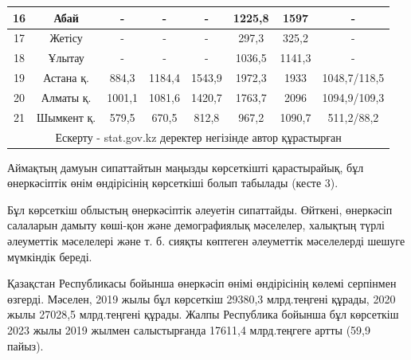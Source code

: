 \begin{table}[H]
{\begin{tabular}{|cccccccc|}
\multicolumn{1}{|c|}{16} &
  \multicolumn{1}{c|}{Абай} &
  \multicolumn{1}{c|}{-} &
  \multicolumn{1}{c|}{-} &
  \multicolumn{1}{c|}{-} &
  \multicolumn{1}{c|}{1225,8} &
  \multicolumn{1}{c|}{1597} &
  - \\ \hline
\multicolumn{1}{|c|}{17} &
  \multicolumn{1}{c|}{Жетісу} &
  \multicolumn{1}{c|}{-} &
  \multicolumn{1}{c|}{-} &
  \multicolumn{1}{c|}{-} &
  \multicolumn{1}{c|}{297,3} &
  \multicolumn{1}{c|}{325,2} &
  - \\ \hline
\multicolumn{1}{|c|}{18} &
  \multicolumn{1}{c|}{Ұлытау} &
  \multicolumn{1}{c|}{-} &
  \multicolumn{1}{c|}{-} &
  \multicolumn{1}{c|}{-} &
  \multicolumn{1}{c|}{1036,5} &
  \multicolumn{1}{c|}{1141,3} &
  - \\ \hline
\multicolumn{1}{|c|}{19} &
  \multicolumn{1}{c|}{Астана қ.} &
  \multicolumn{1}{c|}{884,3} &
  \multicolumn{1}{c|}{1184,4} &
  \multicolumn{1}{c|}{1543,9} &
  \multicolumn{1}{c|}{1972,3} &
  \multicolumn{1}{c|}{1933} &
  1048,7/118,5 \\ \hline
\multicolumn{1}{|c|}{20} &
  \multicolumn{1}{c|}{Алматы қ.} &
  \multicolumn{1}{c|}{1001,1} &
  \multicolumn{1}{c|}{1081,6} &
  \multicolumn{1}{c|}{1420,7} &
  \multicolumn{1}{c|}{1763,7} &
  \multicolumn{1}{c|}{2096} &
  1094,9/109,3 \\ \hline
\multicolumn{1}{|c|}{21} &
  \multicolumn{1}{c|}{Шымкент қ.} &
  \multicolumn{1}{c|}{579,5} &
  \multicolumn{1}{c|}{670,5} &
  \multicolumn{1}{c|}{812,8} &
  \multicolumn{1}{c|}{967,2} &
  \multicolumn{1}{c|}{1090,7} &
  511,2/88,2 \\ \hline
\multicolumn{8}{|c|}{Ескерту - stat.gov.kz деректер негізінде автор құрастырған} \\ \hline
\end{tabular}%
}
\end{table}

\begin{multicols}{2}
Аймақтың дамуын сипаттайтын маңызды көрсеткішті қарастырайық, бұл
өнеркәсіптік өнім өндірісінің көрсеткіші болып табылады (кесте 3).

Бұл көрсеткіш облыстың өнеркәсіптік әлеуетін сипаттайды. Өйткені,
өнеркәсіп салаларын дамыту көші-қон және демографиялық мәселелер,
халықтың түрлі әлеуметтік мәселелері және т. б. сияқты көптеген
әлеуметтік мәселелерді шешуге мүмкіндік береді.

Қазақстан Республикасы бойынша өнеркәсіп өнімі өндірісінің көлемі
серпінмен өзгерді. Мәселен, 2019 жылы бұл көрсеткіш 29380,3 млрд.теңгені
құрады, 2020 жылы 27028,5 млрд.теңгені құрады. Жалпы Республика бойынша
бұл көрсеткіш 2023 жылы 2019 жылмен салыстырғанда 17611,4 млрд.теңгеге
артты (59,9 пайыз).
\end{multicols}

